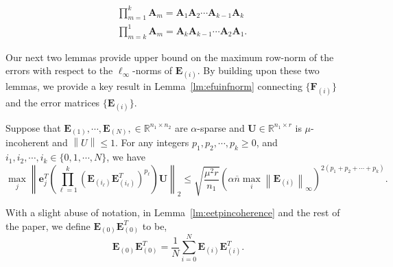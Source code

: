 \documentclass[twoside,11pt]{article}
\newcommand{\norm}[1]{\left\lVert#1\right\rVert}
\newcommand{\matA}{\mathbf{A}}
\newcommand{\matE}{\mathbf{E}}
\newcommand{\matF}{\mathbf{F}}
\newcommand{\hmatH}{{\hat{\mathbf{H}}}{}}
\newcommand{\matU}{\mathbf{U}}
\newcommand{\matUst}{{\mathbf{U}^\star}}
\newcommand{\vece}{\mathbf{e}}
\newcommand{\bn}{{\overline{n}}}
\newcommand{\abnb}{\alpha \bn\max_{i}\norm{\matE_{(i)}}_{\infty}}
\newcommand{\murnone}{\frac{\mu^2 r}{n_1}}
\begin{document}
$$
\begin{aligned}
&\prod_{m=1}^k\matA_m=\matA_1\matA_{2}\cdots \matA_{k-1}\matA_k\\
&\prod_{m=k}^1\matA_m=\matA_k\matA_{k-1}\cdots \matA_2\matA_1.
\end{aligned}
$$

Our next two lemmas provide upper bound on the maximum row-norm of the errors with respect to the $\ell_\infty$-norms of $\matE_{(i)}$. By building upon these two lemmas, we provide a key result in Lemma~\ref{lm:efuinfnorm} connecting $\{\matF_{(i)}\}$ and the error matrices $\{\matE_{(i)}\}$.

\begin{lemma}
\label{lm:eetpincoherence}
Suppose that $\matE_{(1)},\cdots,\matE_{(N)},\in \mathbb{R}^{n_1\times n_2}$ are $\alpha$-sparse and $\matU\in \mathbb{R}^{n_1\times r}$ is $\mu$-incoherent and $\norm{U}\le 1$. For any integers $p_1,p_2,\cdots,p_k\ge 0$, and $i_1,i_2,\cdots,i_k\in\{0,1,\cdots,N\}$, we have
\begin{equation}
\label{eqn:eetpincoherence}
\max_j\norm{\vece_j^T\left(\prod_{\ell=1}^k(\matE_{(i_\ell)}\matE_{(i_\ell)}^T)^{p_\ell}\right)\matU}_2\le \sqrt{\murnone}\left(\abnb\right)^{2(p_1+p_2+\cdots+p_k)}.
\end{equation}
\end{lemma}
With a slight abuse of notation, in Lemma~\ref{lm:eetpincoherence} and the rest of the paper, we define $\matE_{(0)}\matE_{(0)}^T$ to be,
\begin{equation}
\label{eqn:e0e0tdef}
\matE_{(0)}\matE_{(0)}^T = \frac{1}{N}\sum_{i=0}^N\matE_{(i)}\matE_{(i)}^T.
\end{equation}
\end{document}
